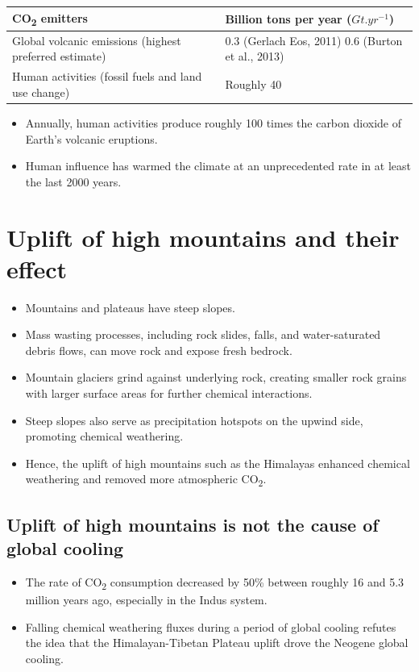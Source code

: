 \documentclass[11pt]{article}
\begin{document}
\begin{center}
\begin{tabular}{|m{13em}|m{10em}|}
\hline
CO\textsubscript{2} emitters & Billion tons per year (\(\unit{Gt.yr^{-1}}\))\\
\hline
Global volcanic emissions (highest preferred estimate) & 0.3 (Gerlach Eos, 2011) 0.6 (Burton et al., 2013)\\
\hline
Human activities (fossil fuels and land use change) & Roughly 40\\
\hline
\end{tabular}
\end{center}

\begin{itemize}
\item Annually, human activities produce roughly 100 times the carbon dioxide of Earth's volcanic eruptions.
\item Human influence has warmed the climate at an unprecedented rate in at least the last 2000 years.
\end{itemize}
\section{Uplift of high mountains and their effect}
\label{sec:org535dcc0}
\begin{itemize}
\item Mountains and plateaus have steep slopes.
\item Mass wasting processes, including rock slides, falls, and water-saturated debris flows, can move rock and expose fresh bedrock.
\item Mountain glaciers grind against underlying rock, creating smaller rock grains with larger surface areas for further chemical interactions.
\item Steep slopes also serve as precipitation hotspots on the upwind side, promoting chemical weathering.
\item Hence, the uplift of high mountains such as the Himalayas enhanced chemical weathering and removed more atmospheric CO\textsubscript{2}.
\end{itemize}
\subsection{Uplift of high mountains is not the cause of global cooling}
\label{sec:org5761aba}
\begin{itemize}
\item The rate of CO\textsubscript{2} consumption decreased by 50\% between roughly 16 and 5.3 million years ago, especially in the Indus system.
\item Falling chemical weathering fluxes during a period of global cooling refutes the idea that the Himalayan-Tibetan Plateau uplift drove the Neogene global cooling.
\end{itemize}
\end{document}
